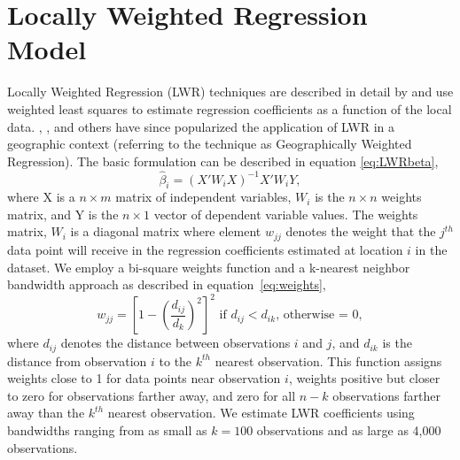 \documentclass{article}\usepackage[]{graphicx}\usepackage[]{color}
\begin{document}
\section{Locally Weighted Regression Model}
Locally Weighted Regression (LWR) techniques are described in detail by \citet{Cleveland1988} and use weighted least squares to estimate regression coefficients as a function of the local data. \citet{Brunsdon1998b}, \citet{Fotheringham2002}, and others have since popularized the application of LWR in a geographic context (referring to the technique as Geographically Weighted Regression). The basic formulation can be described in equation \eqref{eq:LWRbeta}, 
\begin{equation}\label{eq:LWRbeta}
\hat{\beta}_i = (X'W_iX)^{-1}X'W_iY,
\end{equation}
where X is a $n \times m$ matrix of independent variables, $W_i$ is the $n \times n$ weights matrix, and Y is the $n \times 1$ vector of dependent variable values. The weights matrix, $W_i$ is a diagonal matrix where element $w_{jj}$ denotes the weight that the $j^{th}$ data point will receive in the regression coefficients estimated at location $i$ in the dataset. We employ a bi-square weights function and a k-nearest neighbor bandwidth approach as described in equation~\eqref{eq:weights}, 
\begin{equation}\label{eq:weights}
w_{jj}=\left[1-\left(\frac{d_{ij}}{d_{k}}\right)^2 \right]^2 \textrm{ if  }d_{ij}<d_{ik}\textrm{, otherwise = 0},
\end{equation}
where $d_{ij}$ denotes the distance between observations $i$ and $j$, and $d_{ik}$ is the distance from observation $i$ to the $k^{th}$ nearest observation. This function assigns weights close to 1 for data points near observation $i$, weights positive but closer to zero for observations farther away, and zero for all $n-k$ observations farther away than the $k^{th}$ nearest observation. We estimate LWR coefficients using bandwidths ranging from as small as $k=100$ observations and as large as 4,000 observations. 
\end{document}
